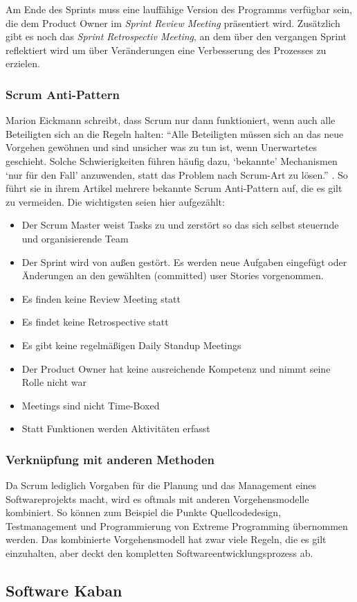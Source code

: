Am Ende des Sprints muss eine lauffähige Version des Programms verfügbar sein, die dem Product Owner im \emph{Sprint Review Meeting} präsentiert wird. Zusätzlich gibt es noch das \emph{Sprint Retrospectiv Meeting}, an dem über den vergangen Sprint reflektiert wird um über Veränderungen eine Verbesserung des Prozesses zu erzielen.

\subsubsection{Scrum Anti-Pattern}
Marion Eickmann schreibt, dass Scrum nur dann funktioniert, wenn auch alle Beteiligten sich an die Regeln halten: ``Alle Beteiligten müssen sich an das neue Vorgehen gewöhnen und sind unsicher was zu tun ist, wenn Unerwartetes geschieht. Solche Schwierigkeiten führen häufig dazu, `bekannte' Mechanismen `nur für den Fall' anzuwenden, statt das Problem nach Scrum-Art zu lösen.'' \cite[S. 84]{bib:ix2010}. So führt sie in ihrem Artikel mehrere bekannte Scrum Anti-Pattern auf, die es gilt zu vermeiden. Die wichtigsten seien hier aufgezählt:
\begin{itemize}
  \item Der Scrum Master weist Tasks zu und zerstört so das sich selbst steuernde und organisierende Team
  \item Der Sprint wird von außen gestört. Es werden neue Aufgaben eingefügt oder Änderungen an den gewählten (committed) user Stories vorgenommen.
  \item Es finden keine Review Meeting statt
  \item Es findet keine Retrospective statt
  \item Es gibt keine regelmäßigen Daily Standup Meetings
  \item Der Product Owner hat keine ausreichende Kompetenz und nimmt seine Rolle nicht war
  \item Meetings sind nicht Time-Boxed
  \item Statt Funktionen werden Aktivitäten erfasst
\end{itemize} 

\subsubsection{Verknüpfung mit anderen Methoden}
Da Scrum lediglich Vorgaben für die Planung und das Management eines Softwareprojekts macht, wird es oftmals mit anderen Vorgehensmodelle kombiniert. So können zum Beispiel die Punkte Quellcodedesign, Testmanagement und Programmierung von Extreme Programming übernommen werden. Das kombinierte Vorgehensmodell hat zwar viele Regeln, die es gilt einzuhalten, aber deckt den kompletten Softwareentwicklungsprozess ab.

\subsection{Software Kaban}

